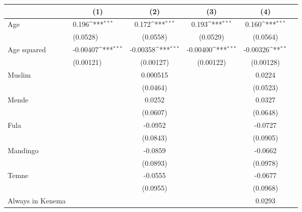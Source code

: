 {
\def\sym#1{\ifmmode^{#1}\else\(^{#1}\)\fi}
\begin{tabularx}{0.8\textwidth}{Xl*{4}{c}}
\hline\hline
                    &\multicolumn{1}{c}{(1)}         &\multicolumn{1}{c}{(2)}         &\multicolumn{1}{c}{(3)}         &\multicolumn{1}{c}{(4)}         \\
\hline
Age                 &       0.196\sym{***}&       0.172\sym{***}&       0.193\sym{***}&       0.160\sym{***}\\
                    &    (0.0528)         &    (0.0558)         &    (0.0529)         &    (0.0564)         \\
[0.5em]
Age squared         &    -0.00407\sym{***}&    -0.00358\sym{***}&    -0.00400\sym{***}&    -0.00326\sym{**} \\
                    &   (0.00121)         &   (0.00127)         &   (0.00122)         &   (0.00128)         \\
[0.5em]
Muslim              &                     &    0.000515         &                     &      0.0224         \\
                    &                     &    (0.0464)         &                     &    (0.0523)         \\
[0.5em]
Mende               &                     &      0.0252         &                     &      0.0327         \\
                    &                     &    (0.0607)         &                     &    (0.0648)         \\
[0.5em]
Fula                &                     &     -0.0952         &                     &     -0.0727         \\
                    &                     &    (0.0843)         &                     &    (0.0905)         \\
[0.5em]
Mandingo            &                     &     -0.0859         &                     &     -0.0662         \\
                    &                     &    (0.0893)         &                     &    (0.0978)         \\
[0.5em]
Temne               &                     &     -0.0555         &                     &     -0.0677         \\
                    &                     &    (0.0955)         &                     &    (0.0968)         \\
[0.5em]
Always in Kenema    &                     &                     &                     &      0.0293         \\

\end{tabularx}}
